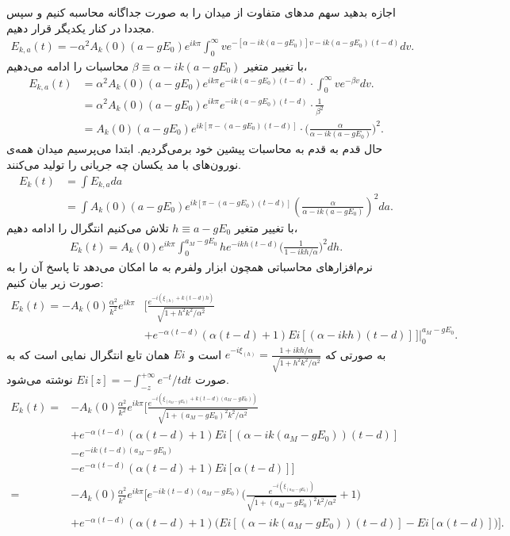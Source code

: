 اجازه بدهید سهم مدهای متفاوت از میدان را به صورت جداگانه محاسبه کنیم و سپس مجددا در کنار یکدیگر قرار دهیم.
\begin{align}
	E_{k,a}(t) = -\alpha^2 A_k(0)(a - gE_0) e^{ik\pi}\int^{\infty}_{0} v e^{-[\alpha - ik(a - gE_0)]v-ik(a - gE_0)(t-d)} dv .
\end{align}
با تغییر متغیر 
$\beta \equiv \alpha - ik(a-gE_0)$
محاسبات را ادامه می‌دهیم،
\begin{align}
	E_{k,a}(t) &= \alpha^2 A_k(0) (a - gE_0) e^{ik\pi} e^{-ik(a-gE_0)(t-d)} \cdot \int^{\infty}_0 v e^{-\beta v}dv . \\
	&= \alpha^2 A_k(0) (a - gE_0) e^{ik\pi} e^{-ik(a-gE_0)(t-d)} \cdot \frac{1}{\beta^2} \\
	&= A_k(0) (a - gE_0) e^{ik[\pi -(a-gE_0)(t-d)]} \cdot \bigg( \frac{\alpha}{\alpha-ik(a-gE_0)} \bigg)^2 .
\end{align}
حال قدم به قدم به محاسبات پیشین خود برمی‌گردیم. ابتدا می‌پرسیم میدان همه‌ی نورون‌های با مد یکسان چه جریانی را تولید می‌کنند.
\begin{align}
	E_k(t) &= \int E_{k,a} da\\
	&= \int A_k(0) (a - gE_0) e^{ik[\pi -(a-gE_0)(t-d)]} (\frac{\alpha}{\alpha-ik(a-gE_0)})^2 da .
\end{align}
با تغییر متغیر
$h \equiv a - gE_0$
تلاش می‌کنیم انتگرال را ادامه دهیم،
\begin{align}
	E_k(t) = A_k(0)e^{ik\pi} \int^{a_M - gE_0}_{0} h e^{-ikh(t-d)} \bigg(\frac{1}{1 - ikh/\alpha}\bigg)^2 dh .
\end{align}
نرم‌افزارهای محاسباتی همچون ابزار ولفرم به ما امکان می‌دهد تا پاسخ آن را به صورت زیر بیان کنیم:
\begin{align}
	E_k(t) = -A_k(0)\frac{\alpha^2}{k^2} e^{ik\pi} &\bigg[ \frac{ e^{-i(\xi_{(h)} + k(t-d)h)} }{\sqrt{1 + h^2 k^2/\alpha^2}} \\
	&+ e^{-\alpha(t-d)}(\alpha(t-d) + 1) Ei[(\alpha-ikh)(t-d)] \, \bigg]	\Biggr|_{0}^{a_M -gE_0} .
\end{align}
به صورتی که 
$e^{-i\xi_{(h)}} = \frac{1 + ikh/\alpha}{\sqrt{1 + h^2 k^2/\alpha^2}}$
است و 
$Ei$
همان تابع انتگرال نمایی است که به صورت 
$Ei[z] = - \int^{+\infty}_{-z} e^{-t}/t dt$
نوشته می‌شود.
\begin{align}
	E_k(t) =& - A_k(0) \frac{\alpha^2}{k^2} e^{ik\pi} \bigg[ \frac{ e^{-i(\xi_{(a_M -gE_0)} + k(t-d)(a_M -gE_0))} }{\sqrt{1 + (a_M -gE_0)^2 k^2/\alpha^2}} \\
	&+ e^{-\alpha(t-d)}(\alpha(t-d) + 1) Ei[(\alpha-ik(a_M -gE_0))(t-d)] \\
	&- e^{-ik(t-d)(a_M -gE_0)} \\
	&- e^{-\alpha(t-d)}(\alpha(t-d) + 1) Ei[\alpha(t-d)] \bigg]\\
	=&- A_k(0) \frac{\alpha^2}{k^2} e^{ik\pi} \bigg[ e^{-ik(t-d)(a_M -gE_0)} \bigg( \frac{ e^{-i(\xi_{(a_M -gE_0)})} }{ \sqrt{1 + (a_M -gE_0)^2 k^2/\alpha^2} } + 1\bigg) \\
	&+ e^{-\alpha(t-d)}(\alpha(t-d) + 1)\bigg( Ei[(\alpha-ik(a_M -gE_0))(t-d)] - Ei[\alpha(t-d)] \bigg) \bigg] .
\end{align}
